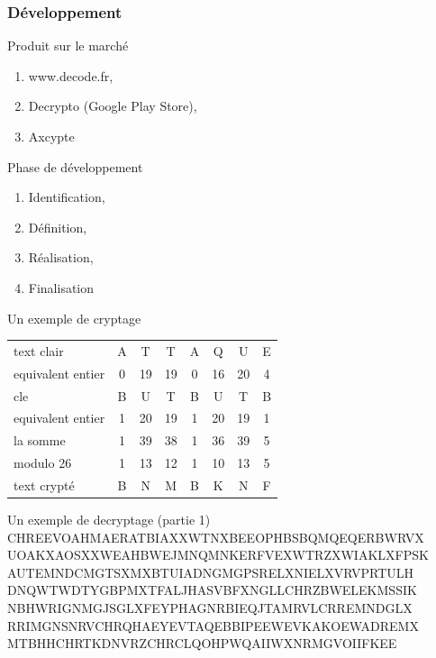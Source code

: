 \documentclass[10pt,xcolor=table]{beamer}
\begin{document}
\begin{frame}[<+->]
  \frametitle{Développement}
  
  \begin{exampleblock}{Produit sur le marché}
	\begin{enumerate}
    \item www.decode.fr,
    \item Decrypto (Google Play Store),
    \item Axcypte
    \end{enumerate}
  \end{exampleblock}

  \begin{block}{Phase de développement}
   
    \begin{enumerate}
    \item Identification,
    \item Définition,
    \item Réalisation,
    \item Finalisation
    \end{enumerate}
  \end{block}

\end{frame}
\begin{frame}
\begin{exampleblock}{Un exemple de cryptage} %
\begin{tabular}{l!{\vrule}ccccccc} 
text clair & A & T & T & A & Q & U & E \pause \\  
equivalent entier & 0 & 19 & 19 & 0 & 16 & 20 & 4 \pause \\ 
cle & B & U & T & B & U & T & B \pause  \\ 
equivalent entier & 1 & 20 & 19 & 1 & 20 & 19 & 1\pause \\ \hline
la somme & 1 & 39 & 38 & 1 & 36 & 39 & 5\pause \\ \hline
modulo 26 & 1 & 13 & 12 & 1 & 10 & 13 & 5 \pause \\ \hline
text crypté & B & N & M & B & K & N & F \pause \\
\end{tabular}
\end{exampleblock}
\begin{exampleblock}{Un exemple de decryptage (partie 1)} %
 CHREEVOAHMAERATBIAXXWTNXBEEOPHBSBQMQEQERBWRVX
 UOAKXAOSXXWEAHBWEJMNQMNKERFVEXWTRZXWIAKLXFPSK
 AUTEMNDCMGTSXMXBTUIADNGMGPSRELXNIELXVRVPRTULH
 DNQWTWDTYGBPMXTFALJHASVBFXNGLLCHRZBWELEKMSSIK
 NBHWRIGNMGJSGLXFEYPHAGNRBIEQJTAMRVLCRREMNDGLX
 RRIMGNSNRVCHRQHAEYEVTAQEBBIPEEWEVKAKOEWADREMX
 MTBHHCHRTKDNVRZCHRCLQOHPWQAIIWXNRMGVOIIFKEE
\end{exampleblock}
\end{frame}
\end{document}
